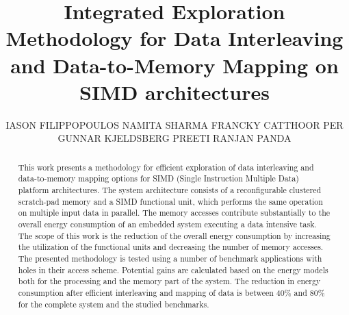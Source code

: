 \documentclass[prodmode,acmtecs]{acmsmall}
\begin{document}

\title{Integrated Exploration Methodology for Data Interleaving and Data-to-Memory Mapping on SIMD architectures}
\author{IASON FILIPPOPOULOS
NAMITA SHARMA 
FRANCKY CATTHOOR
PER GUNNAR KJELDSBERG
PREETI RANJAN PANDA
}

\begin{abstract}
This work presents a methodology for efficient exploration of data interleaving and data-to-memory mapping options for SIMD (Single Instruction Multiple Data) platform architectures.
The system architecture consists of  a reconfigurable clustered scratch-pad memory and a SIMD functional unit, which performs the same operation on multiple input data in parallel. 
The memory accesses contribute substantially to the overall energy consumption of an embedded system executing a data intensive task. 
The scope of this work is the reduction of the overall energy consumption by increasing the utilization of the functional units and decreasing the number of memory accesses.
The presented methodology is tested using a number of benchmark applications with holes in their access scheme.
Potential gains are calculated based on the energy models both for the processing and the memory part of the system.
The reduction in energy consumption after efficient interleaving and mapping of data is between 40\% and 80\% for the complete system and the studied benchmarks.
\end{abstract}




\end{document}
